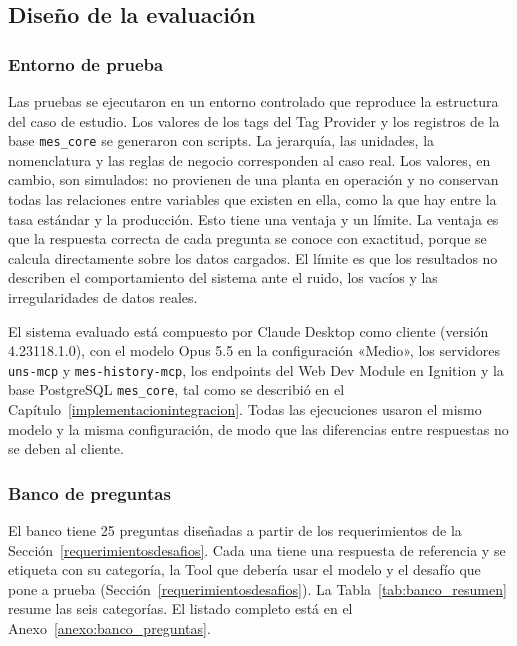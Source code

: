 \subsection{Diseño de la evaluación}
\label{disenoevaluacion}

\subsubsection{Entorno de prueba}

Las pruebas se ejecutaron en un entorno controlado que reproduce la estructura del caso de estudio. Los valores de los tags del Tag Provider y los registros de la base \texttt{mes\_core} se generaron con scripts. La jerarquía, las unidades, la nomenclatura y las reglas de negocio corresponden al caso real. Los valores, en cambio, son simulados: no provienen de una planta en operación y no conservan todas las relaciones entre variables que existen en ella, como la que hay entre la tasa estándar y la producción. Esto tiene una ventaja y un límite. La ventaja es que la respuesta correcta de cada pregunta se conoce con exactitud, porque se calcula directamente sobre los datos cargados. El límite es que los resultados no describen el comportamiento del sistema ante el ruido, los vacíos y las irregularidades de datos reales.

El sistema evaluado está compuesto por Claude Desktop como cliente (versión 4.23118.1.0), con el modelo Opus 5.5 en la configuración «Medio», los servidores \texttt{uns-mcp} y \texttt{mes-history-mcp}, los endpoints del Web Dev Module en Ignition y la base PostgreSQL \texttt{mes\_core}, tal como se describió en el Capítulo~\ref{implementacionintegracion}. Todas las ejecuciones usaron el mismo modelo y la misma configuración, de modo que las diferencias entre respuestas no se deben al cliente.

\subsubsection{Banco de preguntas}

El banco tiene 25 preguntas diseñadas a partir de los requerimientos de la Sección~\ref{requerimientosdesafios}. Cada una tiene una respuesta de referencia y se etiqueta con su categoría, la Tool que debería usar el modelo y el desafío que pone a prueba (Sección~\ref{requerimientosdesafios}). La Tabla~\ref{tab:banco_resumen} resume las seis categorías. El listado completo está en el Anexo~\ref{anexo:banco_preguntas}.

